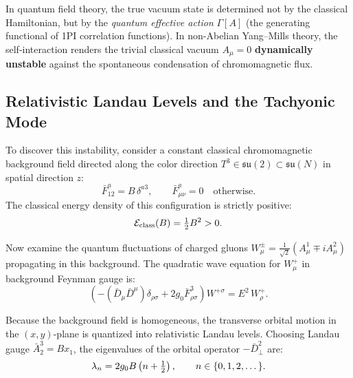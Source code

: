 In quantum field theory, the true vacuum state is determined not by the classical Hamiltonian, but by the \emph{quantum effective action} $\Gamma[A]$ (the generating functional of 1PI correlation functions). In non-Abelian Yang--Mills theory, the self-interaction renders the trivial classical vacuum $A_\mu = 0$ \textbf{dynamically unstable} against the spontaneous condensation of chromomagnetic flux.

\subsection{Relativistic Landau Levels and the Tachyonic Mode}
\label{subsec:relativistic_landau_tachyonic}

To discover this instability, consider a constant classical chromomagnetic background field directed along the color direction $T^3 \in \mathfrak{su}(2) \subset \mathfrak{su}(N)$ in spatial direction $z$:
\begin{equation}
\label{eq:ch10_constant_chromomag_field}
\bar{F}_{12}^a = B \, \delta^{a3}, \qquad \bar{F}_{\mu\nu}^a = 0 \quad \text{otherwise}.
\end{equation}
The classical energy density of this configuration is strictly positive:
\begin{equation}
\label{eq:ch10_classical_energy_density}
\mathcal{E}_{\mathrm{class}}(B) = \tfrac{1}{2} B^2 > 0.
\end{equation}

Now examine the quantum fluctuations of charged gluons $W_\mu^\pm = \frac{1}{\sqrt{2}}(A_\mu^1 \mp i A_\mu^2)$ propagating in this background. The quadratic wave equation for $W_\mu^+$ in background Feynman gauge is:
\begin{equation}
\label{eq:ch10_gluon_wave_equation}
\left( -(\bar{D}_\mu \bar{D}^\mu) \delta_{\rho\sigma} + 2 g_0 \bar{F}_{\rho\sigma}^3 \right) W^{+\sigma} = E^2 \, W_\rho^+.
\end{equation}

Because the background field is homogeneous, the transverse orbital motion in the $(x, y)$-plane is quantized into relativistic Landau levels. Choosing Landau gauge $\bar{A}_2^3 = B x_1$, the eigenvalues of the orbital operator $-\bar{D}_\perp^2$ are:
\begin{equation}
\label{eq:ch10_landau_levels}
\lambda_n = 2 g_0 B \left( n + \tfrac{1}{2} \right), \qquad n \in \{0, 1, 2, \dots\}.
\end{equation}

